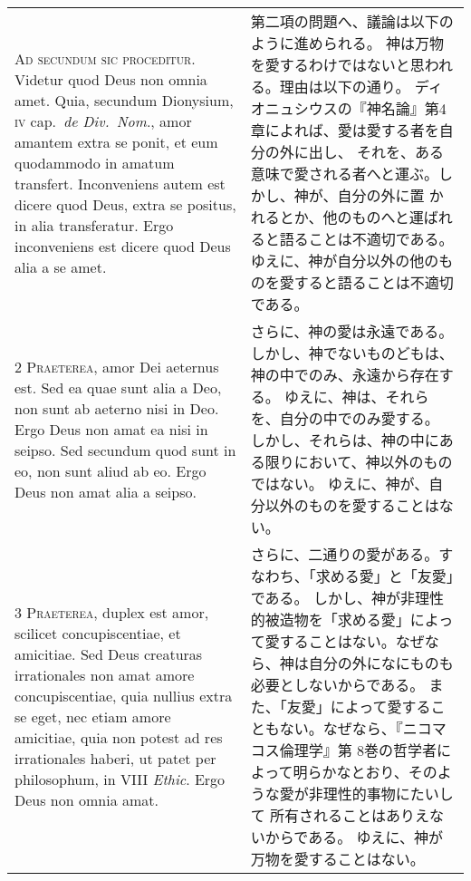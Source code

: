\documentclass[10pt]{jsarticle} %
\begin{document}
\begin{longtable}{p{21em}p{21em}}


{\Huge A}{\scshape d secundum sic proceditur}. Videtur quod
Deus non omnia amet. Quia, secundum Dionysium, {\scshape iv} cap.~{\itshape de Div.~Nom}.,
amor amantem extra se ponit, et eum quodammodo in amatum
transfert. Inconveniens autem est dicere quod Deus, extra se positus, in
alia transferatur. Ergo inconveniens est dicere quod Deus alia a se
amet.


&

第二項の問題へ、議論は以下のように進められる。
神は万物を愛するわけではないと思われる。理由は以下の通り。
ディオニュシウスの『神名論』第4章によれば、愛は愛する者を自分の外に出し、
それを、ある意味で愛される者へと運ぶ。しかし、神が、自分の外に置
 かれるとか、他のものへと運ばれると語ることは不適切である。
ゆえに、神が自分以外の他のものを愛すると語ることは不適切である。


\\


{\scshape 2 Praeterea}, amor Dei aeternus est. Sed ea
quae sunt alia a Deo, non sunt ab aeterno nisi in Deo. Ergo Deus non
amat ea nisi in seipso. Sed secundum quod sunt in eo, non sunt aliud ab
eo. Ergo Deus non amat alia a seipso.


&

さらに、神の愛は永遠である。
しかし、神でないものどもは、神の中でのみ、永遠から存在する。
ゆえに、神は、それらを、自分の中でのみ愛する。
しかし、それらは、神の中にある限りにおいて、神以外のものではない。
ゆえに、神が、自分以外のものを愛することはない。


\\


{\scshape 3 Praeterea}, duplex est amor, scilicet
concupiscentiae, et amicitiae. Sed Deus creaturas irrationales non amat
amore concupiscentiae, quia nullius extra se eget, nec etiam amore
amicitiae, quia non potest ad res irrationales haberi, ut patet per
philosophum, in VIII {\itshape Ethic}. Ergo Deus non omnia amat.


&

さらに、二通りの愛がある。すなわち、「求める愛」と「友愛」である。
しかし、神が非理性的被造物を「求める愛」によって愛することはない。なぜな
 ら、神は自分の外になにものも必要としないからである。
また、「友愛」によって愛することもない。なぜなら、『ニコマコス倫理学』第
 8巻の哲学者によって明らかなとおり、そのような愛が非理性的事物にたいして
 所有されることはありえないからである。
ゆえに、神が万物を愛することはない。



\end{longtable}
\end{document}
